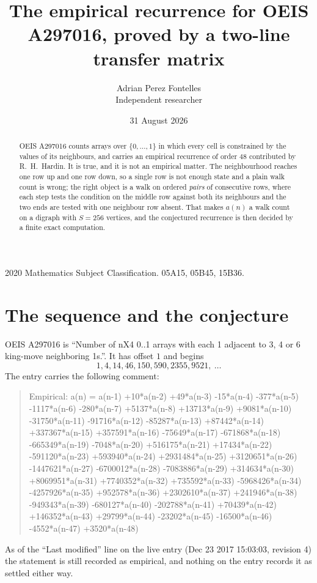 \documentclass[11pt,a4paper]{article}
\title{The empirical recurrence for OEIS A297016, proved by a two-line transfer matrix}
\author{Adrian Perez Fontelles\\ \small Independent researcher}
\date{31 August 2026}
\theoremstyle{plain}
\theoremstyle{definition}
\begin{document}
\maketitle

\begin{abstract}
OEIS A297016 counts arrays over $\{0,\dots,1\}$ in which every cell is constrained by the
values of its neighbours, and carries an empirical recurrence of order $48$ contributed
by R.~H.~Hardin. It is true, and it is not an empirical matter. The neighbourhood reaches one
row up and one row down, so a single row is not enough state and a plain walk count
is wrong; the right object is a walk on ordered \emph{pairs} of consecutive rows, where
each step tests the condition on the middle row against both its neighbours and the two
ends are tested with one neighbour row absent. That makes $a(n)$ a walk count on a digraph
with $S=256$ vertices, and the conjectured recurrence is then decided by a finite exact
computation.
\end{abstract}

\noindent\small 2020 Mathematics Subject Classification. 05A15, 05B45, 15B36.\normalsize

\section{The sequence and the conjecture}

OEIS A297016 is ``Number of nX4 0..1 arrays with each 1 adjacent to 3, 4 or 6 king-move neighboring 1s.''. It has offset $1$ and begins
\[
1, 4, 14, 46, 150, 590, 2355, 9521,\ \dots
\]
The entry carries the following comment:
\begin{quote}\small
Empirical: a(n) = a(n-1) +10*a(n-2) +49*a(n-3) -15*a(n-4) -377*a(n-5) -1117*a(n-6) -280*a(n-7) +5137*a(n-8) +13713*a(n-9) +9081*a(n-10) -31750*a(n-11) -91716*a(n-12) -85287*a(n-13) +87442*a(n-14) +337367*a(n-15) +357591*a(n-16) -75649*a(n-17) -671868*a(n-18) -665349*a(n-19) -7048*a(n-20) +516175*a(n-21) +17434*a(n-22) -591120*a(n-23) +593940*a(n-24) +2931484*a(n-25) +3120651*a(n-26) -1447621*a(n-27) -6700012*a(n-28) -7083886*a(n-29) +314634*a(n-30) +8069951*a(n-31) +7740352*a(n-32) +735592*a(n-33) -5968426*a(n-34) -4257926*a(n-35) +952578*a(n-36) +2302610*a(n-37) +241946*a(n-38) -949343*a(n-39) -680127*a(n-40) -202788*a(n-41) +70439*a(n-42) +146352*a(n-43) +29799*a(n-44) -23202*a(n-45) -16500*a(n-46) -4552*a(n-47) +3520*a(n-48)
\end{quote}
As of the ``Last modified'' line on the live entry (Dec 23 2017 15:03:03, revision 4) the statement is
still recorded as empirical, and nothing on the entry records it as settled either way.
\end{document}
